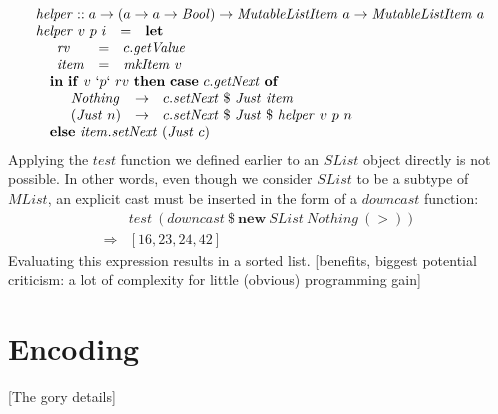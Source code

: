 \documentclass[runningheads,a4paper]{llncs}
\newcommand{\todo}[1]{[{\color{blue}#1}]}
\begin{document}
\begin{displaymath}
\begin{array}{lcl}
\multicolumn{3}{l}{\mathit{helper} :: a \to (a \to a \to \mathit{Bool}) \to \mathit{MutableListItem}~a \to \mathit{MutableListItem}~a} \\
\mathit{helper}~v~p~i & = & \mathbf{let} \\
\multicolumn{3}{l}{\quad \begin{array}{lcl}
\mathit{rv} & = & c.\mathit{getValue} \\
\mathit{item} & = & \mathit{mkItem}~v
\end{array}}\\
\multicolumn{3}{l}{\quad \mathbf{in}~\mathbf{if}~v~`p`~rv~\mathbf{then}~\mathbf{case}~c.\mathit{getNext}~\mathbf{of}} \\
\multicolumn{3}{l}{\quad \quad \begin{array}{lcl}
\mathit{Nothing} & \to & c.\mathit{setNext}~\$~\mathit{Just}~\mathit{item} \\
(\mathit{Just}~n) & \to & c.\mathit{setNext}~\$~\mathit{Just}~\$~\mathit{helper}~v~p~n 
\end{array}} \\
\multicolumn{3}{l}{\quad \mathbf{else}~\mathit{item}.\mathit{setNext}~(\mathit{Just}~c)}
\end{array}
\end{displaymath}
Applying the $\mathit{test}$ function we defined earlier to an $\mathit{SList}$ object directly is not possible. In other words, even though we consider $\mathit{SList}$ to be a subtype of $\mathit{MList}$, an explicit cast must be inserted in the form of a $\mathit{downcast}$ function:
\begin{displaymath}
\begin{array}{cl}
 & \mathit{test}~(downcast~\$~\mathbf{new}~\mathit{SList}~\mathit{Nothing}~(>)) \\
\Rightarrow & [16,23,24,42]
\end{array}
\end{displaymath}   
Evaluating this expression results in a sorted list. \todo{benefits, biggest potential criticism: a lot of complexity for little (obvious) programming gain}

\section{Encoding}
\label{sec:encoding}

\todo{The gory details}
\end{document}
